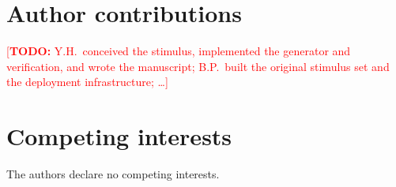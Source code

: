 \documentclass{article}
\newcommand{\TODO}[1]{\textcolor{red}{[\textbf{TODO:} #1]}}
\begin{document}
\section*{Author contributions}
\TODO{Y.H.\ conceived the stimulus, implemented the generator and verification, and wrote the
manuscript; B.P.\ built the original stimulus set and the deployment infrastructure; \ldots}

\section*{Competing interests}
The authors declare no competing interests.



\end{document}
